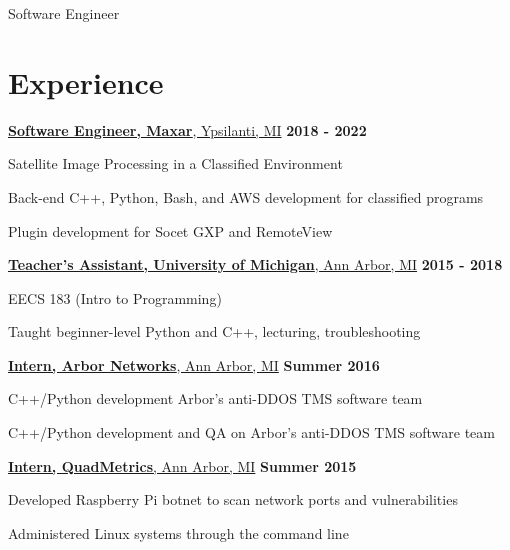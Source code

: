 \documentclass[margin,line]{resume}
\begin{document}
\begin{resume}

    \hfill {\Huge Software Engineer}\\


    \section{\mysidestyle Experience}
    \hfill

    \underline{\textbf{Software Engineer, Maxar}, Ypsilanti, MI}
    \hfill \textbf{\hfill 2018 - 2022} \\

    \begin{list2}
    \item Satellite Image Processing in a Classified Environment
    \item Back-end C++, Python, Bash, and AWS development for classified programs
    \item Plugin development for Socet GXP and RemoteView
    \end{list2}

    \underline{\textbf{Teacher's Assistant, University of Michigan}, Ann Arbor, MI}
    \hfill \textbf{2015 - 2018} \\

    \begin{list2}
    \item EECS 183 (Intro to Programming)
    \item Taught beginner-level Python and C++, lecturing, troubleshooting
    \end{list2}

    \underline{\textbf{Intern, Arbor Networks}, Ann Arbor, MI}
    \hfill \textbf{Summer 2016} \\

    \begin{list2}
    \item C++/Python development Arbor's anti-DDOS TMS software team
    \item C++/Python development and QA on Arbor's anti-DDOS TMS software team
    \end{list2}

    \underline{\textbf{Intern, QuadMetrics}, Ann Arbor, MI}
    \hfill \textbf{\hfill Summer 2015} \\

    \begin{list2}
    \item Developed Raspberry Pi botnet to scan network ports and vulnerabilities
    \item Administered Linux systems through the command line
    \end{list2}


\end{resume}
\end{document}
